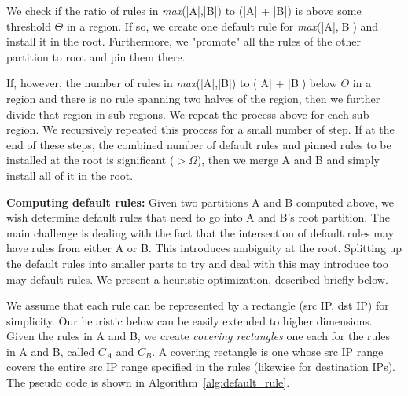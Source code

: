 We check if the ratio of rules in \textit{max}(|A|,|B|) to (|A| + |B|) is above
some threshold $\Theta$ in a region. If so, we create one default rule for
\textit{max}(|A|,|B|) and install it in the root. Furthermore, we "promote" all
the rules of the other partition to root and pin them there. 

If, however, the number of rules in  \textit{max}(|A|,|B|) to (|A| + |B|)  below
$\Theta$ in a region and there is no rule spanning two halves of the region,
then we further divide that region in sub-regions. We repeat the process above
for each sub region. We recursively repeated this process for a small number of
step. If at the end of these steps, the combined number of default rules and
pinned rules to be installed at the root is significant ($> \Omega$), then we
merge A and B and simply install all of it in the root. 

\fi

{\bf Computing default rules:} Given two partitions A and B computed above, we wish determine default rules that need to go into A and B's root 
partition. The main challenge is dealing with the fact that the intersection
of default rules may have rules from either A or B. This 
introduces ambiguity at the root. Splitting up the default rules into smaller parts to try and deal with this may introduce too may default rules. We 
present a heuristic optimization, described briefly below.

We assume that each rule can be represented by a rectangle (src IP, dst IP) for simplicity. Our heuristic below can be easily extended to higher 
dimensions. Given the rules in A and B, we create {\em covering rectangles} one each for the rules in A and B, called $C_A$ and $C_B$. A covering 
rectangle is one whose src IP range covers the entire src IP range specified in the rules (likewise for destination IPs).
The pseudo code is shown in Algorithm~\ref{alg:default_rule}.

